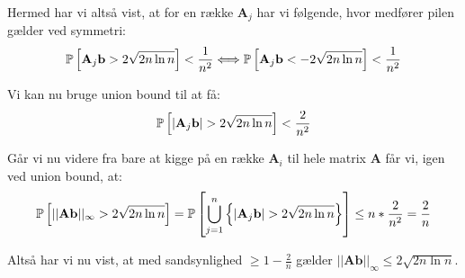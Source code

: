 Hermed har vi altså vist, at for en række $\mathbf A_j$ har vi følgende, hvor medfører pilen gælder ved symmetri:
$$
\P{\mathbf A_j \mathbf b > 2 \sqrt{2 n \ln n}} < \frac{1}{n^2}
\Longleftrightarrow
\P{\mathbf A_j \mathbf b < - 2 \sqrt{2 n \ln n}} < \frac{1}{n^2}
$$

Vi kan nu bruge union bound til at få:
$$
\P{|\mathbf A_j \mathbf b| > 2 \sqrt{2 n \ln n}} < \frac{2}{n^2}
$$

Går vi nu videre fra bare at kigge på en række $\mathbf A_i$ til hele matrix $\mathbf A$ får vi, igen ved union bound, at:
\begin{align*}
  \P{||\mathbf{Ab}||_\infty > 2 \sqrt{2 n \ln n}}
  = \P{ \bigcup_{j=1}^n  \curly{|\mathbf A_j \mathbf b| > 2 \sqrt{2 n \ln n}} }
  \leq n * \frac{2}{n^2}
  = \frac{2}{n}
\end{align*}



Altså har vi nu vist, at med sandsynlighed $\geq 1 - \frac{2}{n}$ gælder $||\mathbf{Ab}||_\infty \leq 2 \sqrt{2 n \ln n}$.
